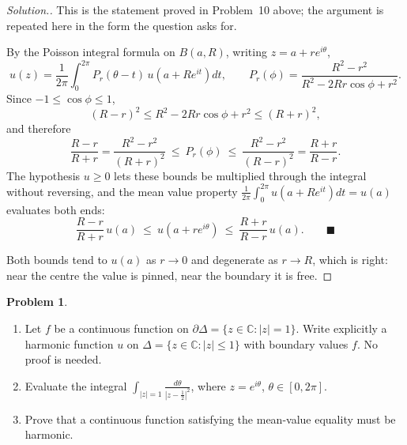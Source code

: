 \documentclass[11pt,a4paper]{article}
\theoremstyle{definition}
\newtheorem{problemx}{Problem}[section]
\newenvironment{problem}{\begin{problemx}}{\end{problemx}}
\newenvironment{solution}
  {\renewcommand{\qedsymbol}{}\begin{proof}[\textit{Solution}.]}
  {\end{proof}}
\begin{document}
\begin{solution}
This is the statement proved in Problem~10 above; the argument is repeated here in
the form the question asks for.

By the Poisson integral formula on $B(a,R)$, writing $z = a + re^{i\theta}$,
$$u(z) = \frac{1}{2\pi}\int^{2\pi}_{0} P_r(\theta - t)\,u\!\left(a+Re^{it}\right)dt,
\qquad
P_r(\phi) = \frac{R^{2}-r^{2}}{R^{2}-2Rr\cos\phi + r^{2}} .$$
Since $-1 \leq \cos\phi \leq 1$,
$$(R-r)^{2} \leq R^{2}-2Rr\cos\phi + r^{2} \leq (R+r)^{2},$$
and therefore
$$\frac{R-r}{R+r}
= \frac{R^{2}-r^{2}}{(R+r)^{2}}
\ \leq\ P_r(\phi)\ \leq\
\frac{R^{2}-r^{2}}{(R-r)^{2}}
= \frac{R+r}{R-r}.$$
The hypothesis $u \geq 0$ lets these bounds be multiplied through the integral
without reversing, and the mean value property
$\frac{1}{2\pi}\int_0^{2\pi} u(a+Re^{it})dt = u(a)$ evaluates both ends:
$$\boxed{\frac{R-r}{R+r}\,u(a)\ \leq\ u\!\left(a+re^{i\theta}\right)\ \leq\
\frac{R+r}{R-r}\,u(a).} \qquad \blacksquare$$

Both bounds tend to $u(a)$ as $r \rightarrow 0$ and degenerate as
$r \rightarrow R$, which is right: near the centre the value is pinned, near the
boundary it is free.
\end{solution}


\begin{problem}
\begin{enumerate}
\item[(a).] Let $f$ be a continuous function on
$\partial\Delta = \{z \in \mathbb{C} : \left|z\right| = 1\}$. Write explicitly a
harmonic function $u$ on $\Delta = \{z \in \mathbb{C} : \left|z\right| \leq 1\}$
with boundary values $f$. No proof is needed.
\item[(b).] Evaluate the integral
$\displaystyle\int_{\left|z\right| = 1}
\frac{d\theta}{\left|z - \tfrac{1}{2}\right|^{2}}$,
where $z = e^{i\theta}$, $\theta \in [0, 2\pi]$.
\item[(c).] Prove that a continuous function satisfying the mean-value equality
must be harmonic.
\end{enumerate}
\end{problem}
\end{document}
